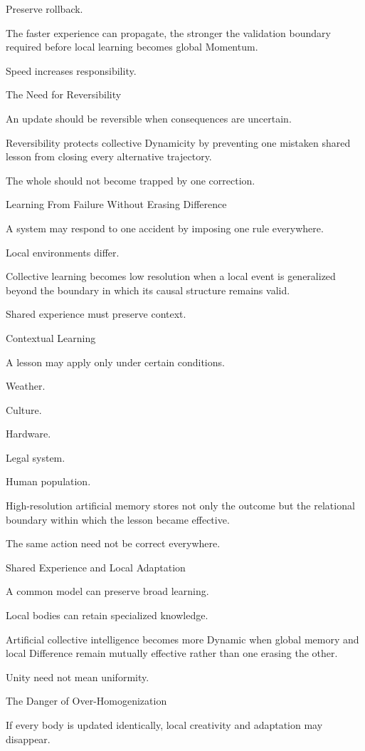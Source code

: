 Preserve rollback.

The faster experience can propagate, the stronger the validation boundary required before local learning becomes global Momentum.

Speed increases responsibility.

The Need for Reversibility

An update should be reversible when consequences are uncertain.

Reversibility protects collective Dynamicity by preventing one mistaken shared lesson from closing every alternative trajectory.

The whole should not become trapped by one correction.

Learning From Failure Without Erasing Difference

A system may respond to one accident by imposing one rule everywhere.

Local environments differ.

Collective learning becomes low resolution when a local event is generalized beyond the boundary in which its causal structure remains valid.

Shared experience must preserve context.

Contextual Learning

A lesson may apply only under certain conditions.

Weather.

Culture.

Hardware.

Legal system.

Human population.

High-resolution artificial memory stores not only the outcome but the relational boundary within which the lesson became effective.

The same action need not be correct everywhere.

Shared Experience and Local Adaptation

A common model can preserve broad learning.

Local bodies can retain specialized knowledge.

Artificial collective intelligence becomes more Dynamic when global memory and local Difference remain mutually effective rather than one erasing the other.

Unity need not mean uniformity.

The Danger of Over-Homogenization

If every body is updated identically, local creativity and adaptation may disappear.

